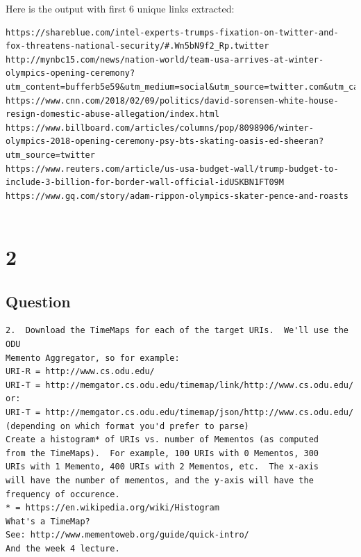 \documentclass[letterpaper,11pt]{article}
\begin{document}
Here is the output with first 6 unique links extracted:
\begin{lstlisting}[frame=single]
https://shareblue.com/intel-experts-trumps-fixation-on-twitter-and-fox-threatens-national-security/#.Wn5bN9f2_Rp.twitter
http://mynbc15.com/news/nation-world/team-usa-arrives-at-winter-olympics-opening-ceremony?utm_content=bufferb5e59&utm_medium=social&utm_source=twitter.com&utm_campaign=buffer
https://www.cnn.com/2018/02/09/politics/david-sorensen-white-house-resign-domestic-abuse-allegation/index.html
https://www.billboard.com/articles/columns/pop/8098906/winter-olympics-2018-opening-ceremony-psy-bts-skating-oasis-ed-sheeran?utm_source=twitter
https://www.reuters.com/article/us-usa-budget-wall/trump-budget-to-include-3-billion-for-border-wall-official-idUSKBN1FT09M
https://www.gq.com/story/adam-rippon-olympics-skater-pence-and-roasts


\end{lstlisting}

\clearpage
\section*{2}
\subsection*{Question}
\begin{verbatim}
2.  Download the TimeMaps for each of the target URIs.  We'll use the ODU 
Memento Aggregator, so for example:
URI-R = http://www.cs.odu.edu/
URI-T = http://memgator.cs.odu.edu/timemap/link/http://www.cs.odu.edu/
or:
URI-T = http://memgator.cs.odu.edu/timemap/json/http://www.cs.odu.edu/
(depending on which format you'd prefer to parse)
Create a histogram* of URIs vs. number of Mementos (as computed
from the TimeMaps).  For example, 100 URIs with 0 Mementos, 300
URIs with 1 Memento, 400 URIs with 2 Mementos, etc.  The x-axis
will have the number of mementos, and the y-axis will have the
frequency of occurence.
* = https://en.wikipedia.org/wiki/Histogram
What's a TimeMap?  
See: http://www.mementoweb.org/guide/quick-intro/
And the week 4 lecture. 
\end{verbatim}
\clearpage
\end{document}
